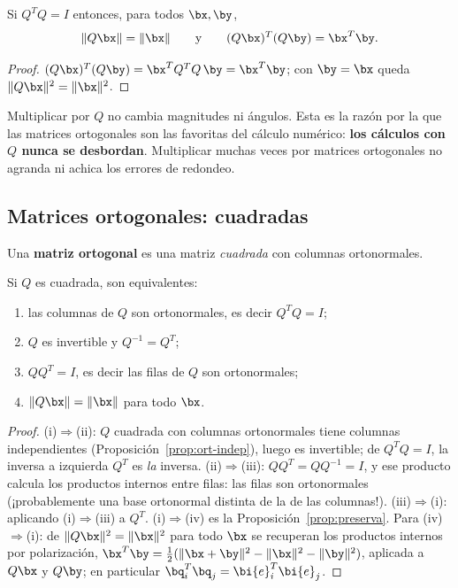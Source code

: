 \begin{proposicion}\label{prop:preserva}
Si $Q^T Q=I$ entonces, para todos $\bx,\by$,
\[
\|Q\bx\|=\|\bx\|
\qquad\text{y}\qquad
(Q\bx)^T(Q\by)=\bx^T\by .
\]
\end{proposicion}

\begin{proof}
$(Q\bx)^T(Q\by)=\bx^T Q^T Q\,\by=\bx^T\by$; con
$\by=\bx$ queda $\|Q\bx\|^2=\|\bx\|^2$.
\end{proof}

Multiplicar por $Q$ no cambia magnitudes ni ángulos. Esta es la razón por la
que las matrices ortogonales son las favoritas del cálculo numérico:
\textbf{los cálculos con $Q$ nunca se desbordan}. Multiplicar muchas veces
por matrices ortogonales no agranda ni achica los errores de redondeo.

\subsection*{Matrices ortogonales: cuadradas}

\begin{definicion}
Una \textbf{matriz ortogonal} es una matriz \emph{cuadrada} con columnas
ortonormales.
\end{definicion}

\begin{teorema}\label{teo:Q-inversa}
Si $Q$ es cuadrada, son equivalentes:
\begin{enumerate}[label=(\roman*),itemsep=1pt]
\item las columnas de $Q$ son ortonormales, es decir $Q^T Q=I$;
\item $Q$ es invertible y $Q^{-1}=Q^T$;
\item $QQ^T=I$, es decir las filas de $Q$ son ortonormales;
\item $\|Q\bx\|=\|\bx\|$ para todo $\bx$.
\end{enumerate}
\end{teorema}

\begin{proof}
(i)$\Rightarrow$(ii): $Q$ cuadrada con columnas ortonormales tiene columnas
independientes (Proposición~\ref{prop:ort-indep}), luego es invertible; de
$Q^T Q=I$, la inversa a izquierda $Q^T$ es \emph{la} inversa.
(ii)$\Rightarrow$(iii): $QQ^T=QQ^{-1}=I$, y ese producto calcula los
productos internos entre filas: las filas son ortonormales (¡probablemente
una base ortonormal distinta de la de las columnas!).
(iii)$\Rightarrow$(i): aplicando (i)$\Rightarrow$(iii) a $Q^T$.
(i)$\Rightarrow$(iv) es la Proposición~\ref{prop:preserva}. Para
(iv)$\Rightarrow$(i): de $\|Q\bx\|^2=\|\bx\|^2$ para todo $\bx$ se
recuperan los productos internos por polarización,
$\bx^T\by=\tfrac12(\|\bx+\by\|^2-\|\bx\|^2-\|\by\|^2)$, aplicada a
$Q\bx$ y $Q\by$; en particular $\bq_i^T\bq_j=\bi{e}_i^T\bi{e}_j$.
\end{proof}

